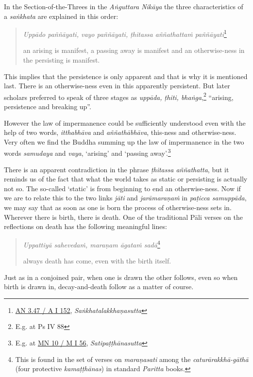 In the Section-of-the-Threes in the \emph{Aṅguttara Nikāya} the three characteristics of a \emph{saṅkhata} are explained in this order:

\begin{quote}
\emph{Uppādo paññāyati, vayo paññāyati, ṭhitassa aññathattaṁ paññāyati}\footnote{\href{https://suttacentral.net/an3.47/pli/ms}{AN 3.47 / A I 152}, \emph{Saṅkhatalakkhaṇasutta}}

an arising is manifest, a passing away is manifest and an otherwise-ness in the persisting is manifest.
\end{quote}

This implies that the persistence is only apparent and that is why it is mentioned last. There is an otherwise-ness even in this apparently persistent. But later scholars preferred to speak of three stages as \emph{uppāda, ṭhiti, bhaṅga},\footnote{E.g. at Ps IV 88} ``arising, persistence and breaking up''.

However the law of impermanence could be sufficiently understood even with the help of two words, \emph{itthabhāva} and \emph{aññathābhāva}, this-ness and otherwise-ness. Very often we find the Buddha summing up the law of impermanence in the two words \emph{samudaya} and \emph{vaya}, `arising' and `passing away'.\footnote{E.g. at \href{https://suttacentral.net/mn10/pli/ms}{MN 10 / M I 56}, \emph{Satipaṭṭhānasutta}}

There is an apparent contradiction in the phrase \emph{ṭhitassa aññathatta}, but it reminds us of the fact that what the world takes as static or persisting is actually not so. The so-called `static' is from beginning to end an otherwise-ness. Now if we are to relate this to the two links \emph{jāti} and \emph{jarāmaraṇaṁ} in \emph{paṭicca samuppāda}, we may say that as soon as one is born the process of otherwise-ness sets in. Wherever there is birth, there is death. One of the traditional Pāli verses on the reflections on death has the following meaningful lines:

\begin{quote}
\emph{Uppattiyā sahevedaṁ, maraṇam āgataṁ sadā}\footnote{This is found in the set of verses on \emph{maraṇasati} among the \emph{caturārakkhā-gāthā} (four protective \emph{kamaṭṭhānas}) in standard \emph{Paritta} books.}

always death has come, even with the birth itself.
\end{quote}

Just as in a conjoined pair, when one is drawn the other follows, even so when birth is drawn in, decay-and-death follow as a matter of course.

